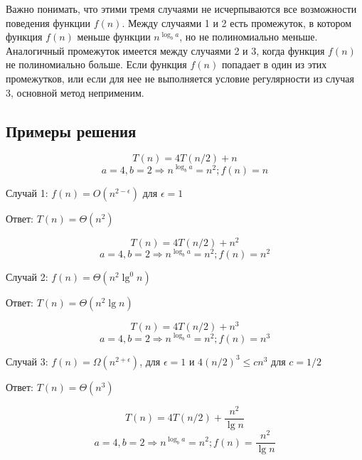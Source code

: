 \documentclass[11pt]{article}
\begin{document}
Важно понимать, что этими тремя случаями не исчерпываются все возможности поведения функции $f(n)$.
Между случаями 1 и 2 есть промежуток, в котором функция $f(n)$ меньше функции $n^{\log_b a}$,
но не полиномиально меньше. Аналогичный промежуток имеется между случаями 2 и 3, когда функция
$f(n)$ не полиномиально больше. Если функция $f(n)$ попадает в один из этих промежутков, или если
для нее не выполняется условие регулярности из случая 3, основной метод неприменим.

\subsection{Примеры решения}

\begin{equation*}
  T(n) = 4T(n/2) + n
\end{equation*}
\begin{equation*}
  a = 4, b = 2 \Rightarrow n^{\log_b a} = n^2; f(n) = n
\end{equation*}

Случай 1: $f(n) = O(n^{2 - \epsilon})$ для $\epsilon = 1$

Ответ: $T(n) = \Theta(n^2)$

\begin{equation*}
  T(n) = 4T(n/2) + n^2
\end{equation*}
\begin{equation*}
  a = 4, b = 2 \Rightarrow n^{\log_b a} = n^2; f(n) = n^2
\end{equation*}

Случай 2: $f(n) = \Theta(n^2 \lg^0 n)$

Ответ: $T(n) = \Theta(n^2 \lg n)$

\begin{equation*}
  T(n) = 4T(n/2) + n^3
\end{equation*}
\begin{equation*}
  a = 4, b = 2 \Rightarrow n^{\log_b a} = n^2; f(n) = n^3
\end{equation*}

Случай 3: $f(n) = \Omega(n^{2 + \epsilon})$, для $\epsilon = 1$ и $4(n/2)^3 \leqslant c n^3$ для $c = 1/2$

Ответ: $T(n) = \Theta(n^3)$

\begin{equation*}
  T(n) = 4T(n/2) + \frac{n^2}{\lg n}
\end{equation*}
\begin{equation*}
  a = 4, b = 2 \Rightarrow n^{\log_b a} = n^2; f(n) = \frac{n^2}{\lg n}
\end{equation*}
\end{document}
